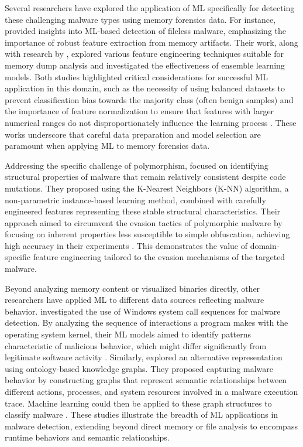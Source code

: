 Several researchers have explored the application of ML specifically for detecting these challenging malware types using memory forensics data. For instance, \citet{khalid2023insight} provided insights into ML-based detection of fileless malware, emphasizing the importance of robust feature extraction from memory artifacts. Their work, along with research by \citet{hossain2024enhanced}, explored various feature engineering techniques suitable for memory dump analysis and investigated the effectiveness of ensemble learning models. Both studies highlighted critical considerations for successful ML application in this domain, such as the necessity of using balanced datasets to prevent classification bias towards the majority class (often benign samples) and the importance of feature normalization to ensure that features with larger numerical ranges do not disproportionately influence the learning process \cite{khalid2023insight, hossain2024enhanced}. These works underscore that careful data preparation and model selection are paramount when applying ML to memory forensics data.

Addressing the specific challenge of polymorphism, \citet{khoje2024revolutionary} focused on identifying structural properties of malware that remain relatively consistent despite code mutations. They proposed using the K-Nearest Neighbors (K-NN) algorithm, a non-parametric instance-based learning method, combined with carefully engineered features representing these stable structural characteristics. Their approach aimed to circumvent the evasion tactics of polymorphic malware by focusing on inherent properties less susceptible to simple obfuscation, achieving high accuracy in their experiments \cite{khoje2024revolutionary}. This demonstrates the value of domain-specific feature engineering tailored to the evasion mechanisms of the targeted malware.

Beyond analyzing memory content or visualized binaries directly, other researchers have applied ML to different data sources reflecting malware behavior. \citet{hammi2024malware} investigated the use of Windows system call sequences for malware detection. By analyzing the sequence of interactions a program makes with the operating system kernel, their ML models aimed to identify patterns characteristic of malicious behavior, which might differ significantly from legitimate software activity \cite{hammi2024malware}. Similarly, \citet{chowdhury2022capturing} explored an alternative representation using ontology-based knowledge graphs. They proposed capturing malware behavior by constructing graphs that represent semantic relationships between different actions, processes, and system resources involved in a malware execution trace. Machine learning could then be applied to these graph structures to classify malware \cite{chowdhury2022capturing}. These studies illustrate the breadth of ML applications in malware detection, extending beyond direct memory or file analysis to encompass runtime behaviors and semantic relationships.

